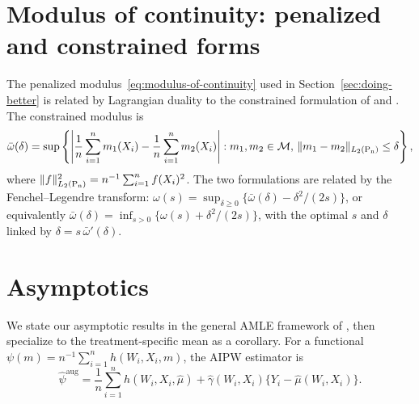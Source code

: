 \documentclass{article}
\DeclarePairedDelimiter\norm{\lVert}{\rVert}
\theoremstyle{definition}
\DeclareMathOperator{\Pn}{P_n}
\newcommand{\hgamma}{\ensuremath{\hat\gamma}}
\newcommand{\model}{\mathcal{M}}
\newcommand{\aug}{\text{aug}}
\newcommand{\<}{\langle}
\renewcommand{\>}{\rangle}
\begin{document}
\ifarxiv\begin{refsection}\fi

\section{Modulus of continuity: penalized and constrained forms}
\label{app:modulus-equivalence}

The penalized modulus~\eqref{eq:modulus-of-continuity} used in Section~\ref{sec:doing-better} is related by Lagrangian duality to the constrained formulation of \citet{donoho1994statistical} and \citet{armstrong2018optimal}. The constrained modulus is
\begin{equation}
\label{eq:modulus-constrained}
\bar\omega(\delta) = \sup\left\{\left|\frac{1}{n}\sum_{i=1}^n m_1(X_i) - \frac{1}{n}\sum_{i=1}^n m_2(X_i)\right| : m_1, m_2 \in \model,\, \norm{m_1 - m_2}_{L_2(\Pn)} \le \delta\right\},
\end{equation}
where $\norm{f}_{L_2(\Pn)}^2 = n^{-1}\sum_{i=1}^n f(X_i)^2$. The two formulations are related by the Fenchel--Legendre transform: $\omega(s) = \sup_{\delta \ge 0}\{\bar\omega(\delta) - \delta^2/(2s)\}$, or equivalently $\bar\omega(\delta) = \inf_{s > 0}\{\omega(s) + \delta^2/(2s)\}$, with the optimal $s$ and $\delta$ linked by $\delta = s\,\bar\omega'(\delta)$.

\section{Asymptotics}
\label{sec:appendix-asymptotic-normality}

We state our asymptotic results in the general AMLE framework of \citet{hirshberg2021augmented}, then specialize to the treatment-specific mean as a corollary. For a functional $\psi(m) = n^{-1}\sum_{i=1}^n h(W_i, X_i, m)$, the AIPW estimator is
\[
\hat\psi^{\aug} = \frac{1}{n}\sum_{i=1}^n h(W_i, X_i,\hat \mu) + \hgamma(W_i, X_i)\{Y_i - \hat \mu(W_i, X_i)\}.
\]


\end{refsection}
\end{document}
